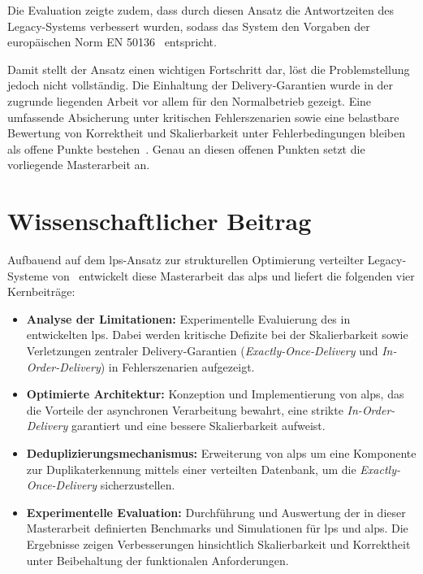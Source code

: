 Die Evaluation zeigte zudem, dass durch diesen Ansatz die Antwortzeiten des Legacy-Systems verbessert wurden, sodass das System den Vorgaben der europäischen Norm EN 50136~\citep{din_en_50136-12012-08_alarm_2012} entspricht.

Damit stellt der Ansatz einen wichtigen Fortschritt dar, löst die Problemstellung jedoch nicht vollständig. Die Einhaltung der Delivery-Garantien wurde in der zugrunde liegenden Arbeit vor allem für den Normalbetrieb gezeigt. Eine umfassende Absicherung unter kritischen Fehlerszenarien sowie eine belastbare Bewertung von Korrektheit und Skalierbarkeit unter Fehlerbedingungen bleiben als offene Punkte bestehen~\citep{liebig_2025_architectural_refactoring}. Genau an diesen offenen Punkten setzt die vorliegende Masterarbeit an.


\section{Wissenschaftlicher Beitrag}
\label{sec:wissenschaftlicher_beitrag}

Aufbauend auf dem \gls{lps}-Ansatz zur strukturellen Optimierung verteilter Legacy-Systeme von~\citep{liebig_2025_architectural_refactoring} entwickelt diese Masterarbeit das \gls{alps} und liefert die folgenden vier Kernbeiträge:

\begin{itemize}
    \item \textbf{Analyse der Limitationen:} Experimentelle Evaluierung des in~\citep{liebig_2025_architectural_refactoring} entwickelten \gls{lps}. Dabei werden kritische Defizite bei der Skalierbarkeit sowie Verletzungen zentraler Delivery-Garantien (\textit{Exactly-Once-Delivery} und \textit{In-Order-Delivery}) in Fehlerszenarien aufgezeigt.

    \item \textbf{Optimierte Architektur:} Konzeption und Implementierung von \gls{alps}, das die Vorteile der asynchronen Verarbeitung bewahrt, eine strikte \textit{In-Order-Delivery} garantiert und eine bessere Skalierbarkeit aufweist.

    \item \textbf{Deduplizierungsmechanismus:} Erweiterung von \gls{alps} um eine Komponente zur Duplikaterkennung mittels einer verteilten Datenbank, um die \textit{Exactly-Once-Delivery} sicherzustellen.

    \item \textbf{Experimentelle Evaluation:} Durchführung und Auswertung der in dieser Masterarbeit definierten Benchmarks und Simulationen für \gls{lps} und \gls{alps}. Die Ergebnisse zeigen Verbesserungen hinsichtlich Skalierbarkeit und Korrektheit unter Beibehaltung der funktionalen Anforderungen.
\end{itemize}

